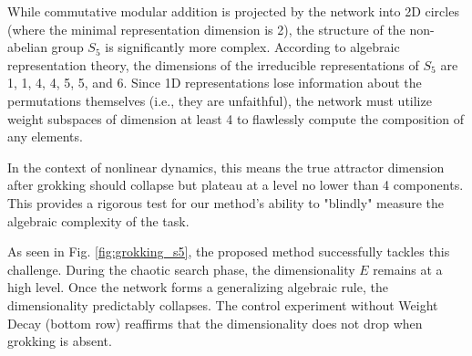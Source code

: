 \documentclass{article}
\begin{document}
While commutative modular addition is projected by the network into 2D circles (where the minimal representation dimension is 2), the structure of the non-abelian group $S_5$ is significantly more complex. According to algebraic representation theory, the dimensions of the irreducible representations of $S_5$ are 1, 1, 4, 4, 5, 5, and 6. Since 1D representations lose information about the permutations themselves (i.e., they are unfaithful), the network must utilize weight subspaces of dimension at least 4 to flawlessly compute the composition of any elements. 

In the context of nonlinear dynamics, this means the true attractor dimension after grokking should collapse but plateau at a level no lower than 4 components. This provides a rigorous test for our method's ability to "blindly" measure the algebraic complexity of the task.

As seen in Fig. \ref{fig:grokking_s5}, the proposed method successfully tackles this challenge. During the chaotic search phase, the dimensionality $E$ remains at a high level. Once the network forms a generalizing algebraic rule, the dimensionality predictably collapses. The control experiment without Weight Decay (bottom row) reaffirms that the dimensionality does not drop when grokking is absent.
\end{document}
